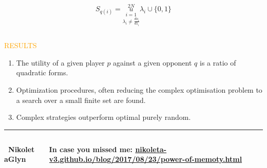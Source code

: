 \documentclass[usenames,dvipsnames,t]{beamer}
\begin{document}
\begin{columns}
\begin{column}{.8\linewidth}
\begin{columns}
\begin{column}{.4\linewidth}
\begin{minipage}{50cm}
\begin{block}
            \[ S_{q(i)} =  \overset{2N}{\underset{\lambda_i \neq \frac{do_i}{d1_i}}{\underset{i=1}{u}}} \lambda_i \cup \{0, 1\} \]
            \end{block}
        \end{minipage}
    \end{column}
\end{columns}
\vspace{0.3cm}
\begin{center}
    \textcolor{orange}{\Large{RESULTS}}
\end{center}
       \begin{enumerate}
           \item The utility of a given player \(p\) against a given opponent \(q\) 
           is a ratio of quadratic forms.
           \item Optimization procedures, often reducing the complex optimisation 
           problem to a search over a small finite set are found.
           \item Complex strategies outperform optimal purely random.
       \end{enumerate}
       \vspace{1cm}

\hrule height 3pt
\begin{columns}
    \begin{column}{.1\linewidth}

        \centering
        \textbf{ \faTwitter \ NikoletaGlyn}
    \end{column}
    \begin{column}{.55\linewidth}

        \centering
        \textbf{ In case you missed me: \url{nikoleta-v3.github.io/blog/2017/08/23/power-of-memoty.html}}
    \end{column}
    \begin{column}{.1\linewidth}


\end{column}
\end{columns}
\end{column}
\end{columns}
\end{document}
